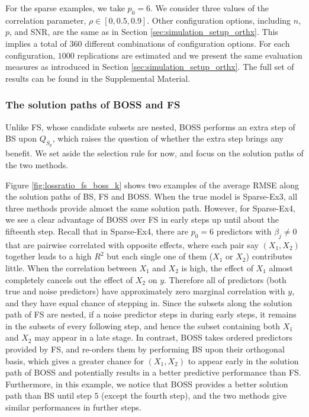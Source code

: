 For the sparse examples, we take $p_0=6$. We consider three values of the correlation parameter, $\rho \in [0, 0.5, 0.9]$. Other configuration options, including $n$, $p$, and SNR, are the same as in Section \ref{sec:simulation_setup_orthx}. This implies a total of $360$ different combinations of configuration options. For each configuration, $1000$ replications are estimated and we present the same evaluation measures as introduced in Section \ref{sec:simulation_setup_orthx}. The full set of results can be found in the Supplemental Material.


\subsubsection{The solution paths of BOSS and FS}
Unlike FS, whose candidate subsets are nested, BOSS performs an extra step of BS upon $Q_{S_p}$, which raises the question of whether the extra step brings any benefit. We set aside the selection rule for now, and focus on the solution paths of the two methods. 

Figure \ref{fig:lossratio_fs_boss_k} shows two examples of the average RMSE along the solution paths of BS, FS and BOSS. When the true model is Sparse-Ex3, all three methods provide almost the same solution path. However, for Sparse-Ex4, we see a clear advantage of BOSS over FS in early steps up until about the fifteenth step. Recall that in Sparse-Ex4, there are $p_0=6$ predictors with $\beta_j \ne 0$ that are pairwise correlated with opposite effects, where each pair say $(X_1,X_2)$ together leads to a high $R^2$ but each single one of them ($X_1$ or $X_2$) contributes little. When the correlation between $X_1$ and $X_2$ is high, the effect of $X_1$ almost completely cancels out the effect of $X_2$ on $y$. Therefore all of predictors (both true and noise predictors) have approximately zero marginal correlation with $y$, and they have equal chance of stepping in. Since the subsets along the solution path of FS are nested, if a noise predictor steps in during early steps, it remains in the subsets of every following step, and hence the subset containing both $X_1$ and $X_2$ may appear in a late stage. In contrast, BOSS takes ordered predictors provided by FS, and re-orders them by performing BS upon their orthogonal basis, which gives a greater chance for $(X_1,X_2)$ to appear early in the solution path of BOSS and potentially results in a better predictive performance than FS. Furthermore, in this example, we notice that BOSS provides a better solution path than BS until step $5$ (except the fourth step), and the two methods give similar performances in further steps.

